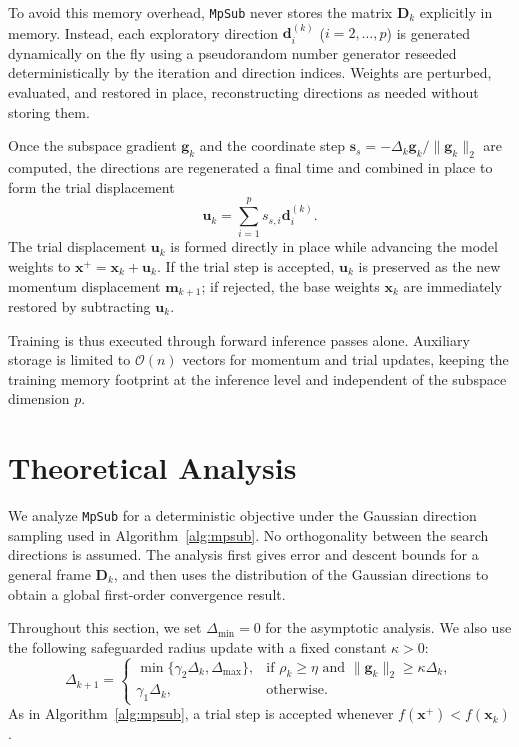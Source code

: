 \documentclass{siamart171218}
\newcommand{\bx}{\bm{x}}
\newcommand{\bd}{\bm{d}}
\newcommand{\bg}{\bm{g}}
\newcommand{\bs}{\bm{s}}
\begin{document}
To avoid this memory overhead, \texttt{MpSub} never stores the matrix $\bm D_k$ explicitly in memory. Instead, each exploratory direction $\bd_i^{(k)}$ ($i = 2, \ldots, p$) is generated dynamically on the fly using a pseudorandom number generator reseeded deterministically by the iteration and direction indices. Weights are perturbed, evaluated, and restored in place, reconstructing directions as needed without storing them.

Once the subspace gradient $\bg_k$ and the coordinate step $\bs_s = -\Delta_k \bg_k / \|\bg_k\|_2$ are computed, the directions are regenerated a final time and combined in place to form the trial displacement
\begin{equation}
\bm u_k = \sum_{i=1}^p s_{s,i} \bd_i^{(k)}.
\label{eq:trial_displacement}
\end{equation}
The trial displacement $\bm u_k$ is formed directly in place while advancing the model weights to $\bx^+ = \bx_k + \bm u_k$. If the trial step is accepted, $\bm u_k$ is preserved as the new momentum displacement $\bm m_{k+1}$; if rejected, the base weights $\bx_k$ are immediately restored by subtracting $\bm u_k$.

Training is thus executed through forward inference passes alone. Auxiliary storage is limited to $\mathcal{O}(n)$ vectors for momentum and trial updates, keeping the training memory footprint at the inference level and independent of the subspace dimension $p$.

\section{Theoretical Analysis}
\label{sec:analysis}

We analyze \texttt{MpSub} for a deterministic objective under the Gaussian direction sampling used in Algorithm~\ref{alg:mpsub}. No orthogonality between the search directions is assumed. The analysis first gives error and descent bounds for a general frame $\bm D_k$, and then uses the distribution of the Gaussian directions to obtain a global first-order convergence result.

Throughout this section, we set $\Delta_{\min}=0$ for the asymptotic analysis. We also use the following safeguarded radius update with a fixed constant $\kappa>0$:
\begin{equation}
\label{eq:safeguarded_radius}
\Delta_{k+1} =
\begin{cases}
\min\{\gamma_2\Delta_k,\Delta_{\max}\}, & \text{if } \rho_k\ge\eta \text{ and } \|\bg_k\|_2\ge\kappa\Delta_k, \\
\gamma_1\Delta_k, & \text{otherwise}.
\end{cases}
\end{equation}
As in Algorithm~\ref{alg:mpsub}, a trial step is accepted whenever $f(\bx^+) < f(\bx_k)$.
\end{document}
